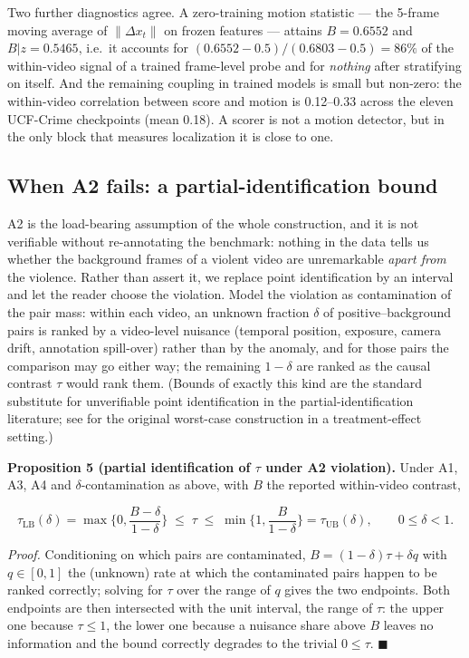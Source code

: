\documentclass[number,preprint,12pt]{elsarticle}
\begin{document}
Two further diagnostics agree. A zero-training motion statistic --- the 5-frame
moving average of \(\lVert\Delta x_t\rVert\) on frozen features --- attains \(B=0.6552\) and
\(B|z=0.5465\), i.e.~it accounts for \((0.6552-0.5)/(0.6803-0.5)=86\%\) of
the within-video signal of a trained frame-level probe and for \emph{nothing} after
stratifying on itself. And the remaining coupling in trained models is small but
non-zero: the within-video correlation between score and motion is 0.12--0.33
across the eleven UCF-Crime checkpoints (mean 0.18). A scorer is not a motion detector, but
in the only block that measures localization it is close to one.

\subsection{When A2 fails: a partial-identification bound}\label{sec:bound}

A2 is the load-bearing assumption of the whole construction, and it is not
verifiable without re-annotating the benchmark: nothing in the data tells us
whether the background frames of a violent video are unremarkable \emph{apart from}
the violence. Rather than assert it, we replace point identification by an
interval and let the reader choose the violation. Model the violation as
contamination of the pair mass: within each video, an unknown fraction \(\delta\) of
positive--background pairs is ranked by a video-level nuisance (temporal
position, exposure, camera drift, annotation spill-over) rather than by the
anomaly, and for those pairs the comparison may go either way; the remaining
\(1-\delta\) are ranked as the causal contrast \(\tau\) would rank them. (Bounds of exactly
this kind are the standard substitute for unverifiable point identification in the
partial-identification literature; see \citep{manski1990bounds} for the original worst-case
construction in a treatment-effect setting.)

\textbf{Proposition 5 (partial identification of \(\tau\) under A2 violation).} Under A1, A3,
A4 and \(\delta\)-contamination as above, with \(B\) the reported within-video contrast,

\begin{equation}
\tau_{\mathrm{LB}}(\delta)=\max\Big\{0,\frac{B-\delta}{1-\delta}\Big\}\;\le\;\tau\;\le\;\min\Big\{1,\frac{B}{1-\delta}\Big\}=\tau_{\mathrm{UB}}(\delta),
\qquad 0\le\delta<1.
\label{eq:tau-bound}
\end{equation}

\emph{Proof.} Conditioning on which pairs are contaminated, \(B=(1-\delta)\tau+\delta q\) with
\(q\in[0,1]\) the (unknown) rate at which the contaminated pairs happen to be
ranked correctly; solving for \(\tau\) over the range of \(q\) gives the two endpoints.
Both endpoints are then intersected with the unit interval, the range of \(\tau\):
the upper one because \(\tau\le 1\), the lower one because a nuisance share above \(B\)
leaves no information and the bound correctly degrades to the trivial \(0\le\tau\).
\(\blacksquare\)
\end{document}
